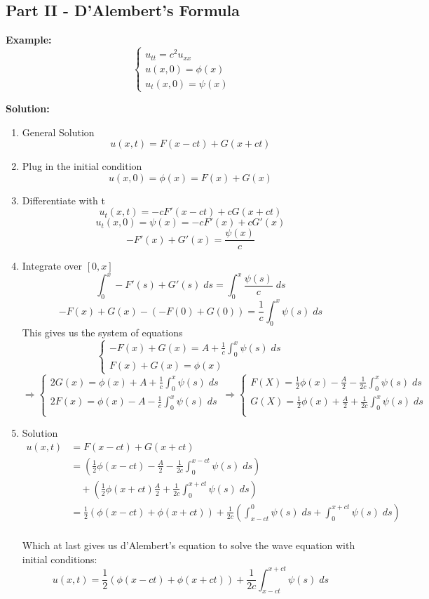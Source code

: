 \documentclass[12pt]{article}
\begin{document}
\subsection*{Part II - D'Alembert's Formula}
\textbf{Example:}
\[\begin{cases}
    u_{tt} = c^2 u_{xx}\\
    u(x, 0) = \phi(x)\\
    u_t(x, 0) = \psi(x)
\end{cases}\]

\textbf{Solution:}
\begin{enumerate}
    \item General Solution
    \[u(x, t) = F(x - ct) + G(x + ct)\]
    \item Plug in the initial condition
    \[u(x, 0) = \phi(x) = F(x) + G(x)\]
    \item Differentiate with t 
    \[u_t(x, t) = -cF'(x - ct) + cG(x + ct)\]
    \[u_t(x, 0) = \psi(x) = -cF'(x) + cG'(x)\]
    \[-F'(x) + G'(x) = \frac{\psi(x)}{c}\]
    \item Integrate over $[0, x]$
    \[\int_0^x -F'(s) + G'(s) \; ds = \int_0^x \frac{\psi(s)}{c} \; ds\]
    \[-F(x) + G(x) - (-F(0) + G(0)) = \frac{1}{c} \int_0^x \psi(s) \; ds\]
    This gives us the system of equations
    \[\begin{cases}
        -F(x) + G(x) = A + \frac{1}{c} \int_0^x \psi(s) \; ds\\
        F(x) + G(x) = \phi(x)
    \end{cases}\]
    \[\Longrightarrow \begin{cases}
        2G(x) = \phi(x) + A + \frac{1}{c} \int_0^x \psi(s) \; ds\\
        2F(x) = \phi(x) - A - \frac{1}{c} \int_0^x \psi(s) \; ds\\
    \end{cases} \Longrightarrow \begin{cases}
        F(X) = \frac{1}{2}\phi(x) - \frac{A}{2} - \frac{1}{2c}\int_0^x \psi(s) \; ds\\
        G(X) = \frac{1}{2}\phi(x) + \frac{A}{2} + \frac{1}{2c}\int_0^x \psi(s) \; ds\\
    \end{cases}\]
    \item Solution 
    \begin{align*}
        u(x, t) &= F(x - ct) + G(x + ct)\\
        &= (\frac{1}{2}\phi(x - ct) - \frac{A}{2} - \frac{1}{2c}\int_0^{x- ct}\psi(s) \; ds) \\
        &\quad + (\frac{1}{2}\phi(x + ct) \frac{A}{2} + \frac{1}{2c}\int_0^{x + ct} \psi(s) \; ds)\\
        &= \frac{1}{2}(\phi(x - ct) + \phi(x + ct)) + \frac{1}{2c}\left(\int_{x-ct}^0 \psi(s)\; ds + \int_0^{x  +ct} \psi(s) \; ds\right)\\
    \end{align*}

    Which at last gives us d'Alembert's equation to solve the wave equation with initial conditions:
    \[\boxed{u(x, t) = \frac{1}{2}(\phi(x - ct) + \phi(x + ct)) + \frac{1}{2c}\int_{x - ct}^{x + ct} \psi(s)\;ds}\]
\end{enumerate}
\end{document}
